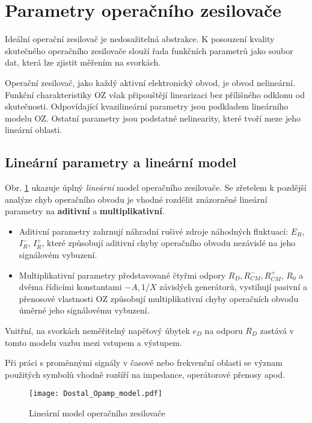   \section{Parametry operačního zesilovače}
    Ideální operační zesilovač je nedosažitelná abstrakce. K posouzení kvality sku\-teč\-ného 
    operačního zesilovače slouží řada funkčních parametrů jako soubor dat, která lze zjistit měřením 
    na svorkách.
   
    Operační zesilovač, jako každý aktivní elektronický obvod, je obvod nelineární. Funkční 
    charakteristiky OZ však připouštějí linearizaci bez přílišného odklonu od skutečnosti. 
    Odpovídající kvazilineární parametry jsou podkladem lineárního modelu OZ. Ostatní parametry jsou 
    podstatné nelinearity, které tvoří meze jeho lineární oblasti.
    
    \subsection{Lineární parametry a lineární model}
      Obr. \ref{AES:fig_lin_model_opamp} ukazuje úplný \emph{lineární} model operačního zesilovače. 
      Se zřetelem k pozdější analýze chyb operačního obvodu je vhodné rozdělit znázorněné lineární 
      parametry na 
      \textbf{aditivní} a \textbf{multiplikativní}.
      \begin{itemize}
        \item Aditivní parametry zahrnují náhradní rušivé zdroje náhodných fluktuací: $E_R$, 
              $I_R^-$, $I_R^+$, které způsobují aditivní chyby operačního obvodu nezávislé na jeho 
               signálovém vybuzení.
        \item Multiplikativní parametry představované čtyřmi odpory $R_D, R^-_{CM}, R^+_{CM}$, $R_0$ 
              a dvěma řídicími konstantami $-A, 1/X$ závislých generátorů, vystihují pasivní a 
              přenosové vlastnosti OZ způsobují multiplikativní chyby operačních obvodu úměrné jeho 
              signálovému vybuzení.
      \end{itemize}
      Vnitřní, na svorkách neměřitelný napěťový úbytek $e_D$ na odporu $R_D$ zastává v tomto modelu 
      vazbu mezi vstupem a výstupem.
     
      Při práci s proměnnými signály v časové nebo frekvenční oblasti se  význam použitých symbolů 
      vhodně rozšíří na impedance, operátorové přenosy apod.
      \begin{figure}[ht!]
        \centering
        \texttt{[image: Dostal\_Opamp\_model.pdf]}
        \caption[Lineární model operačního zesilovače]{Lineární model operačního zesilovače}
        \label{AES:fig_lin_model_opamp}
      \end{figure}
  
